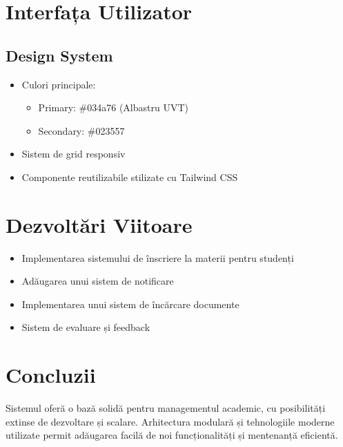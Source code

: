 \documentclass[12pt,a4paper]{article}
\begin{document}
\section{Interfața Utilizator}
\subsection{Design System}
\begin{itemize}
    \item Culori principale: 
    \begin{itemize}
        \item Primary: \#034a76 (Albastru UVT)
        \item Secondary: \#023557
    \end{itemize}
    \item Sistem de grid responsiv
    \item Componente reutilizabile stilizate cu Tailwind CSS
\end{itemize}

\section{Dezvoltări Viitoare}
\begin{itemize}
    \item Implementarea sistemului de înscriere la materii pentru studenți
    \item Adăugarea unui sistem de notificare
    \item Implementarea unui sistem de încărcare documente
    \item Sistem de evaluare și feedback
\end{itemize}

\section{Concluzii}
Sistemul oferă o bază solidă pentru managementul academic, cu posibilități extinse de dezvoltare și scalare. Arhitectura modulară și tehnologiile moderne utilizate permit adăugarea facilă de noi funcționalități și mentenanță eficientă.
\end{document}
